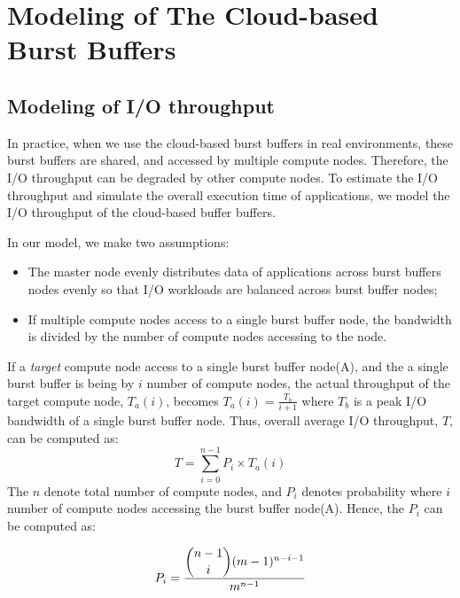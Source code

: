 \section{Modeling of The Cloud-based Burst Buffers}
\label{sec:modeling}
\subsection{Modeling of I/O throughput}
In practice, when we use the cloud-based burst buffers in real environments,
these burst buffers are shared, and accessed by multiple compute nodes.
Therefore, the I/O throughput can be degraded by other compute nodes.
To estimate the I/O throughput and simulate the overall execution
time of applications, we model the I/O throughput of the cloud-based buffer
buffers.

In our model, we make two assumptions: 
\begin{itemize}
  \item The master node evenly distributes data of applications across burst
  buffers nodes evenly so that I/O workloads are balanced across
  burst buffer nodes;
  \item If multiple compute nodes access to a single burst buffer node, the
  bandwidth is divided by the number of compute nodes accessing to the node.
\end{itemize}
If a \emph{target} compute node access to a single burst buffer node(A), and the  
a single burst buffer is being by $i$ number of compute nodes, the actual
throughput of the target compute node, $T_{a}(i)$, becomes
$T_{a}(i)=\frac{T_{b}}{i+1}$ where $T_{b}$ is a peak I/O bandwidth of a single
burst buffer node. Thus, overall average I/O throughput, $T$, can be computed as:
\begin{equation}
T=\sum_{i=0}^{n-1} P_{i} \times T_{a}(i)\label{model:throughput}
\end{equation}
The $n$ denote total number of compute nodes, and $P_{i}$ denotes probability
where $i$ number of compute nodes accessing the burst buffer node(A). 
Hence, the $P_{i}$ can be computed as:


\begin{equation}
P_i=\frac{\dbinom{n-1}{i}(m-1)^{n-i-1}}{m^{n-1}}
\end{equation}

